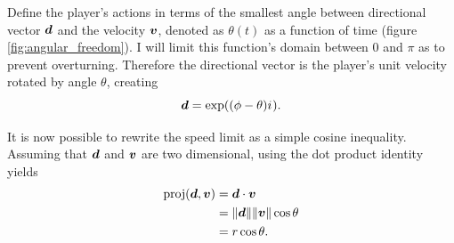 Define the player's actions in terms of the smallest angle between directional vector $\boldsymbol{d}$ and the velocity $\boldsymbol{v}$, denoted as $\theta(t)$ as a function of time (figure \ref{fig:angular_freedom}). I will limit this function's domain between $0$ and $\pi$ as to prevent overturning. Therefore the directional vector is the player's unit velocity rotated by angle $\theta$, creating
\[
\boldsymbol{d} = \exp((\phi - \theta) {i\mkern1mu}).
\]


%
It is now possible to rewrite the speed limit as a simple cosine inequality. Assuming that $\boldsymbol{d}$ and $\boldsymbol{v}$ are two dimensional, using the dot product identity yields
\begin{align*}
    \text{proj}(\boldsymbol{d}, \boldsymbol{v}) &= \boldsymbol{d} \cdot \boldsymbol{v}\\
    &= \|\boldsymbol{d}\| \|\boldsymbol{v}\| \cos \theta\\
    &= r \cos \theta.
\end{align*}



